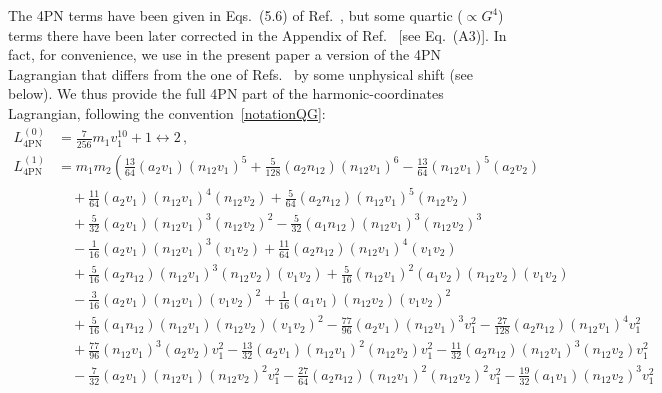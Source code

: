 \documentclass[prd,preprint,superscriptaddress,tightenlines,nofootinbib,
  eqsecnum,showpacs]{revtex4}
\begin{document}
The 4PN terms have been given in Eqs.~(5.6) of Ref.~\cite{BBBFMa}, but some
quartic ($\propto G^4$) terms there have been later corrected in the Appendix
of Ref.~\cite{BBBFMb} [see Eq.~(A3)]. In fact, for convenience, we use in the
present paper a version of the 4PN Lagrangian that differs from the
one of Refs.~\cite{BBBFMa, BBBFMb} by some unphysical shift (see below). We
thus provide the full 4PN part of the harmonic-coordinates Lagrangian,
following the convention~\eqref{notationQG}:
%
{\allowdisplaybreaks
\begin{subequations}\label{result4PN}
\begin{align}
L_\text{4PN}^{(0)}&= \frac{7}{256} m_{1} v_1^{10}
 + 1 \leftrightarrow
2\,,\\
L_\text{4PN}^{(1)}&= m_{1} m_{2} \left(\frac{13}{64} (a_2 v_1) (n_{12} v_1)^5
 + \frac{5}{128} (a_2 n_{12}) (n_{12} v_1)^6
 -  \frac{13}{64} (n_{12} v_1)^5 (a_2 v_2)\right.\nonumber\\
& \quad + \frac{11}{64} (a_2 v_1) (n_{12} v_1)^4 (n_{12} v_2)
 + \frac{5}{64} (a_2 n_{12}) (n_{12} v_1)^5 (n_{12} v_2)\nonumber\\
& \quad + \frac{5}{32} (a_2 v_1) (n_{12} v_1)^3 (n_{12} v_2)^2
 -  \frac{5}{32} (a_1 n_{12}) (n_{12} v_1)^3 (n_{12} v_2)^3\nonumber\\
& \quad -  \frac{1}{16} (a_2 v_1) (n_{12} v_1)^3 (v_1 v_2)
 + \frac{11}{64} (a_2 n_{12}) (n_{12} v_1)^4 (v_1 v_2)\nonumber\\
& \quad + \frac{5}{16} (a_2 n_{12}) (n_{12} v_1)^3 (n_{12} v_2) (v_1 v_2)
 + \frac{5}{16} (n_{12} v_1)^2 (a_1 v_2) (n_{12} v_2) (v_1 v_2)\nonumber\\
& \quad -  \frac{3}{16} (a_2 v_1) (n_{12} v_1) (v_1 v_2)^2
 + \frac{1}{16} (a_1 v_1) (n_{12} v_2) (v_1 v_2)^2\nonumber\\
& \quad + \frac{5}{16} (a_1 n_{12}) (n_{12} v_1) (n_{12} v_2) (v_1 v_2)^2
 -  \frac{77}{96} (a_2 v_1) (n_{12} v_1)^3 v_1^{2}
 -  \frac{27}{128} (a_2 n_{12}) (n_{12} v_1)^4 v_1^{2}\nonumber\\
& \quad + \frac{77}{96} (n_{12} v_1)^3 (a_2 v_2) v_1^{2}
 -  \frac{13}{32} (a_2 v_1) (n_{12} v_1)^2 (n_{12} v_2) v_1^{2}
 -  \frac{11}{32} (a_2 n_{12}) (n_{12} v_1)^3 (n_{12} v_2) v_1^{2}\nonumber\\
& \quad -  \frac{7}{32} (a_2 v_1) (n_{12} v_1) (n_{12} v_2)^2 v_1^{2}
 -  \frac{27}{64} (a_2 n_{12}) (n_{12} v_1)^2 (n_{12} v_2)^2 v_1^{2}
 -  \frac{19}{32} (a_1 v_1) (n_{12} v_2)^3 v_1^{2}\nonumber\\

\end{align}
\end{subequations}}
\end{document}
